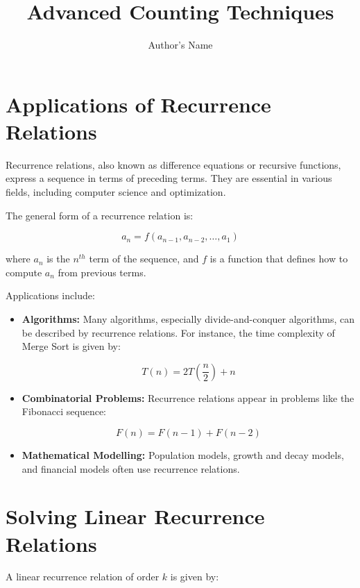 \documentclass{article}
\begin{document}
    \title{Advanced Counting Techniques}
    \author{Author's Name}
    \maketitle

    \section{Applications of Recurrence Relations}
    Recurrence relations, also known as difference equations or recursive functions, express a sequence in terms of preceding terms. They are essential in various fields, including computer science and optimization.

    The general form of a recurrence relation is:

    \begin{equation}
        a_n = f(a_{n-1}, a_{n-2}, \ldots, a_1)
    \end{equation}

    where \(a_n\) is the \(n^{th}\) term of the sequence, and \(f\) is a function that defines how to compute \(a_n\) from previous terms.

    Applications include:

    \begin{itemize}
        \item {\bf Algorithms:} Many algorithms, especially divide-and-conquer algorithms, can be described by recurrence relations. For instance, the time complexity of Merge Sort is given by:

        \begin{equation}
            T(n) = 2T\left(\frac{n}{2}\right) + n
        \end{equation}

        \item {\bf Combinatorial Problems:} Recurrence relations appear in problems like the Fibonacci sequence:

        \begin{equation}
            F(n) = F(n - 1) + F(n - 2)
        \end{equation}

        \item {\bf Mathematical Modelling:} Population models, growth and decay models, and financial models often use recurrence relations.
    \end{itemize}

    \section{Solving Linear Recurrence Relations}
    A linear recurrence relation of order $k$ is given by:
\end{document}

